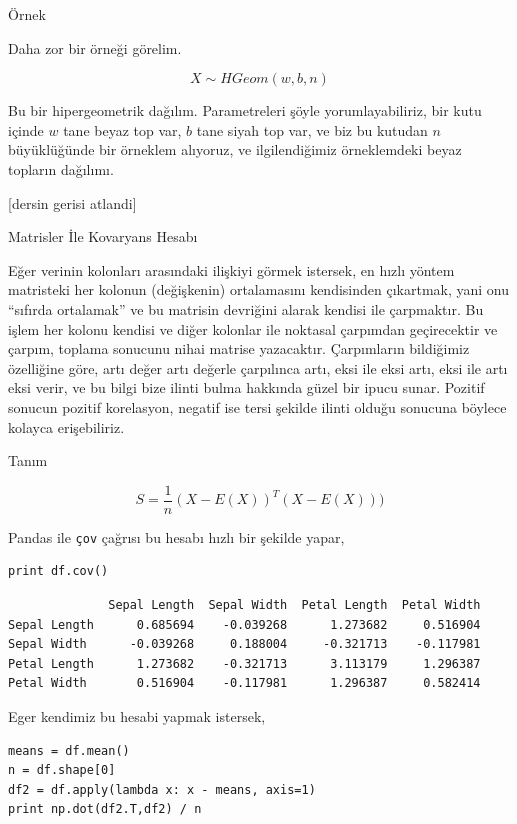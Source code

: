 \documentclass[12pt,fleqn]{article}\usepackage{../../common}
\begin{document}
Örnek

Daha zor bir örneği görelim. 

$$ X \sim HGeom(w,b,n) $$

Bu bir hipergeometrik dağılım. Parametreleri şöyle yorumlayabiliriz, bir
kutu içinde $w$ tane beyaz top var, $b$ tane siyah top var, ve biz bu
kutudan $n$ büyüklüğünde bir örneklem alıyoruz, ve ilgilendiğimiz
örneklemdeki beyaz topların dağılımı. 

[dersin gerisi atlandi]

Matrisler İle Kovaryans Hesabı

Eğer verinin kolonları arasındaki ilişkiyi görmek istersek, en hızlı yöntem
matristeki her kolonun (değişkenin) ortalamasını kendisinden çıkartmak,
yani onu ``sıfırda ortalamak'' ve bu matrisin devriğini alarak kendisi ile
çarpmaktır. Bu işlem her kolonu kendisi ve diğer kolonlar ile noktasal
çarpımdan geçirecektir ve çarpım, toplama sonucunu nihai matrise
yazacaktır. Çarpımların bildiğimiz özelliğine göre, artı değer artı değerle
çarpılınca artı, eksi ile eksi artı, eksi ile artı eksi verir, ve bu bilgi
bize ilinti bulma hakkında güzel bir ipucu sunar. Pozitif sonucun pozitif
korelasyon, negatif ise tersi şekilde ilinti olduğu sonucuna böylece
kolayca erişebiliriz.

Tanım

$$ S = \frac{1}{n} (X-E(X))^T(X-E(X))) $$

Pandas ile \verb!çov! çağrısı bu hesabı hızlı bir şekilde yapar,

\begin{verbatim}
print df.cov()
\end{verbatim}

\begin{verbatim}
              Sepal Length  Sepal Width  Petal Length  Petal Width
Sepal Length      0.685694    -0.039268      1.273682     0.516904
Sepal Width      -0.039268     0.188004     -0.321713    -0.117981
Petal Length      1.273682    -0.321713      3.113179     1.296387
Petal Width       0.516904    -0.117981      1.296387     0.582414
\end{verbatim}

Eger kendimiz bu hesabi yapmak istersek,

\begin{verbatim}
means = df.mean()
n = df.shape[0]
df2 = df.apply(lambda x: x - means, axis=1)
print np.dot(df2.T,df2) / n
\end{verbatim}
\end{document}
